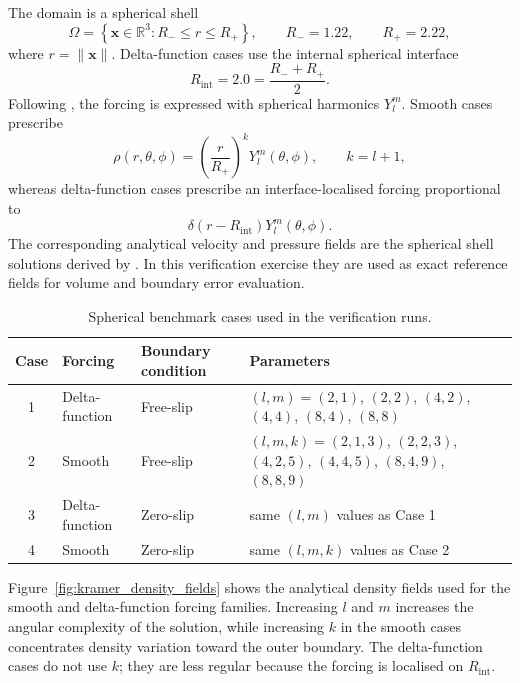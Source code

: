\documentclass[gmd, manuscript]{copernicus}
\begin{document}
The domain is a spherical shell
\begin{equation}
  \Omega =
  \left\{\mathbf{x}\in\mathbb{R}^3:
  R_- \leq r \leq R_+\right\},
  \qquad
  R_-=1.22,
  \qquad
  R_+=2.22,
\end{equation}
where \(r=\|\mathbf{x}\|\). Delta-function cases use the internal spherical
interface
\begin{equation}
  R_{\mathrm{int}}=2.0=\frac{R_-+R_+}{2}.
\end{equation}
Following , the forcing is expressed with spherical
harmonics \(Y_l^m\). Smooth cases prescribe
\begin{equation}
  \rho(r,\theta,\phi)
  =
  \left(\frac{r}{R_+}\right)^k Y_l^m(\theta,\phi),
  \qquad
  k=l+1,
\end{equation}
whereas delta-function cases prescribe an interface-localised forcing
proportional to
\begin{equation}
  \delta(r-R_{\mathrm{int}})Y_l^m(\theta,\phi).
\end{equation}
The corresponding analytical velocity and pressure fields are the spherical
shell solutions derived by . In this verification exercise
they are used as exact reference fields for volume and boundary error
evaluation.

\begin{table}[H]
\centering
\caption{Spherical  benchmark cases used in the  verification runs.}
\label{tab:kramer_cases}
\begin{tabular}{clll}
\toprule
Case & Forcing & Boundary condition & Parameters \\
\midrule
1 & Delta-function & Free-slip & \((l,m)=(2,1)\), \((2,2)\), \((4,2)\), \((4,4)\), \((8,4)\), \((8,8)\) \\
2 & Smooth & Free-slip & \((l,m,k)=(2,1,3)\), \((2,2,3)\), \((4,2,5)\), \((4,4,5)\), \((8,4,9)\), \((8,8,9)\) \\
3 & Delta-function & Zero-slip & same \((l,m)\) values as Case 1 \\
4 & Smooth & Zero-slip & same \((l,m,k)\) values as Case 2 \\
\bottomrule
\end{tabular}
\end{table}

Figure~\ref{fig:kramer_density_fields} shows the analytical density fields used
for the smooth and delta-function forcing families. Increasing \(l\) and \(m\)
increases the angular complexity of the solution, while increasing \(k\) in the
smooth cases concentrates density variation toward the outer boundary. The
delta-function cases do not use \(k\); they are less regular because the
forcing is localised on \(R_{\mathrm{int}}\).
\end{document}

